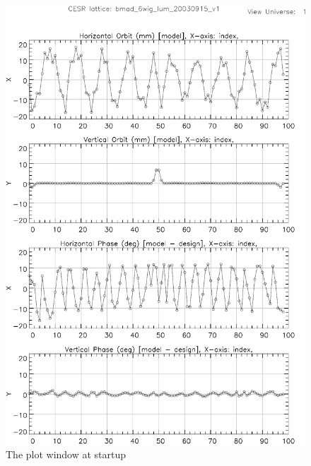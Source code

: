 \begin{figure}
  \centering
  \includegraphics[width=5in]{plot-page1.pdf}
  \caption{The plot window at startup}
  \label{f:plot.begin}
\end{figure}

